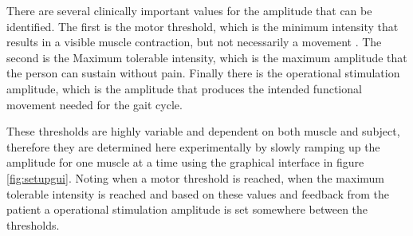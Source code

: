 There are several clinically important values for the amplitude that can be identified. The first is the motor threshold, which is the minimum intensity  that results in a visible muscle contraction, but not necessarily a movement \cite{marquez-chin_functional_2020}. The second is the Maximum tolerable intensity, which is the maximum amplitude that the person can sustain without pain. Finally there is the operational stimulation amplitude, which is the amplitude that produces the intended functional movement needed for the gait cycle. 

These thresholds are highly variable and dependent on both muscle and subject, therefore they are determined here experimentally by slowly ramping up the amplitude for one muscle at a time using the graphical interface in figure \ref{fig:setupgui}. Noting when a motor threshold is reached, when the maximum tolerable intensity is reached and based on these values and feedback from the patient a operational stimulation amplitude is set somewhere between the thresholds. 



